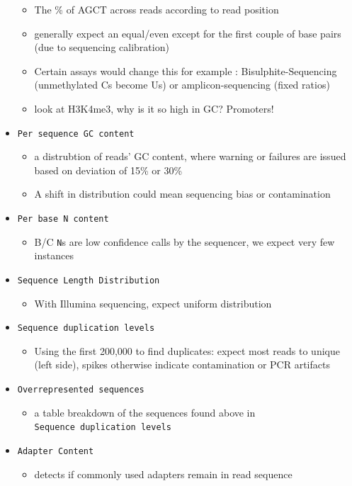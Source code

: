 \documentclass[
]{book}
\providecommand{\tightlist}{%
  \setlength{\itemsep}{0pt}\setlength{\parskip}{0pt}}
\begin{document}
\begin{itemize}
  \begin{itemize}
  \tightlist
  \item
    The \% of AGCT across reads according to read position
  \item
    generally expect an equal/even except for the first couple of base pairs (due to sequencing calibration)
  \item
    Certain assays would change this for example : Bisulphite-Sequencing (unmethylated Cs become Us) or amplicon-sequencing (fixed ratios)
  \item
    look at H3K4me3, why is it so high in GC? Promoters!
  \end{itemize}
\item
  \texttt{Per\ sequence\ GC\ content}

  \begin{itemize}
  \tightlist
  \item
    a distrubtion of reads' GC content, where warning or failures are issued based on deviation of 15\% or 30\%
  \item
    A shift in distribution could mean sequencing bias or contamination
  \end{itemize}
\item
  \texttt{Per\ base\ N\ content}

  \begin{itemize}
  \tightlist
  \item
    B/C \texttt{N}s are low confidence calls by the sequencer, we expect very few instances
  \end{itemize}
\item
  \texttt{Sequence\ Length\ Distribution}

  \begin{itemize}
  \tightlist
  \item
    With Illumina sequencing, expect uniform distribution
  \end{itemize}
\item
  \texttt{Sequence\ duplication\ levels}

  \begin{itemize}
  \tightlist
  \item
    Using the first 200,000 to find duplicates: expect most reads to unique (left side), spikes otherwise indicate contamination or PCR artifacts
  \end{itemize}
\item
  \texttt{Overrepresented\ sequences}

  \begin{itemize}
  \tightlist
  \item
    a table breakdown of the sequences found above in \texttt{Sequence\ duplication\ levels}
  \end{itemize}
\item
  \texttt{Adapter\ Content}

  \begin{itemize}
  \tightlist
  \item
    detects if commonly used adapters remain in read sequence
  \end{itemize}
\end{itemize}
\end{document}

